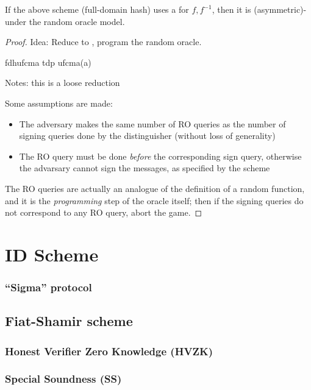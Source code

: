 \begin{theorem}
    If the above scheme (full-domain hash) uses a \tdp{} for $f, f^{-1}$, then it is (asymmetric)-\ufcma under the random oracle model.
\end{theorem}

\begin{proof}
    Idea: Reduce to \tdp, program the random oracle.

    \begin{cryptoredux}
        {fdhufcma}
        {}
        {tdp}
        {ufcma(a)}



        \cseqdelay
        \cseqbeginloop
        \invoke{}{$\sigma$}{}
        \cseqendloop
        \cseqdelay


        \send{}{$\sigma^*$}{}
    \end{cryptoredux}

    Notes: this is a loose reduction

    Some assumptions are made:

    \begin{itemize}
        \item The adversary makes the same number of RO queries as the number of signing queries done by the distinguisher (without loss of generality)
        \item The RO query must be done \emph{before} the corresponding sign query, otherwise the advarsary cannot sign the messages, as specified by the scheme
    \end{itemize}

    The RO queries are actually an analogue of the definition of a random function, and it is the \emph{programming} step of the oracle itself; then if the signing queries do not correspond to any RO query, abort the game.

\end{proof}

\section{ID Scheme}

\subsubsection{``Sigma'' protocol}

\subsection{Fiat-Shamir scheme}

\subsubsection{Honest Verifier Zero Knowledge (HVZK)}

\subsubsection{Special Soundness (SS)}
